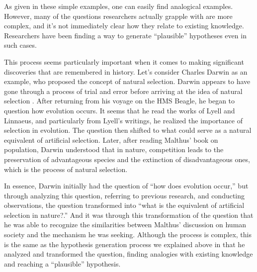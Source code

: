 \documentclass{book}
\begin{document}
As given in these simple examples, one can easily find analogical examples. However, many of the questions researchers actually grapple with are more complex, and it's not immediately clear how they relate to existing knowledge. Researchers have been finding a way to generate ``plausible'' hypotheses even in such cases. 

This process seems particularly important when it comes to making significant discoveries that are remembered in history. Let's consider Charles Darwin as an example, who proposed the concept of natural selection. Darwin appears to have gone through a process of trial and error before arriving at the idea of natural selection \cite{gribbin2022origin}. After returning from his voyage on the HMS Beagle, he began to question how evolution occurs. It seems that he read the works of Lyell and Linnaeus, and particularly from Lyell's writings, he realized the importance of selection in evolution. The question then shifted to what could serve as a natural equivalent of artificial selection. Later, after reading Malthus' book on population, Darwin understood that in nature, competition leads to the preservation of advantageous species and the extinction of disadvantageous ones, which is the process of natural selection.

In essence, Darwin initially had the question of ``how does evolution occur,'' but through analyzing this question, referring to previous research, and conducting observations, the question transformed into ``what is the equivalent of artificial selection in nature?.'' And it was through this transformation of the question that he was able to recognize the similarities between Malthus' discussion on human society and the mechanism he was seeking. Although the process is complex, this is the same as the hypothesis generation process we explained above in that he analyzed and transformed the question, finding analogies with existing knowledge and reaching a ``plausible'' hypothesis.
\end{document}

